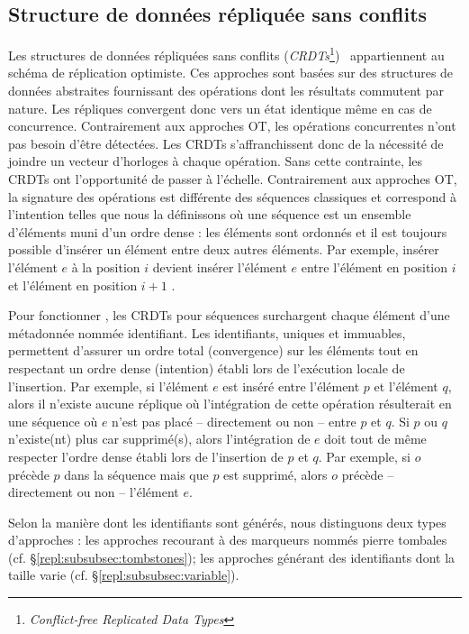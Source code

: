 \subsection{Structure de données répliquée sans conflits}
\label{repl:subsec:crdts}

Les structures de données répliquées sans conflits
(\emph{CRDTs}\footnote{\emph{Conflict-free Replicated Data
    Types}})~\cite{shapiro2011comprehensive, shapiro2011conflict} appartiennent
au schéma de réplication optimiste. Ces approches sont basées sur des structures
de données abstraites fournissant des opérations dont les résultats commutent
par nature. Les répliques convergent donc vers un état identique même en cas de
concurrence. Contrairement aux approches OT, les opérations concurrentes n'ont
pas besoin d'être détectées. Les CRDTs s'affranchissent donc de la nécessité de
joindre un vecteur d'horloges à chaque opération. Sans cette contrainte, les
CRDTs ont l'opportunité de passer à l'échelle. Contrairement aux approches OT,
la signature des opérations est différente des séquences \og classiques \fg et
correspond à l'intention telles que nous la définissons où une séquence est un
ensemble d'éléments muni d'un ordre dense : les éléments sont ordonnés et il est
toujours possible d'insérer un élément entre deux autres éléments. Par exemple,
\og insérer l'élément $e$ à la position $i$ \fg devient \og insérer l'élément
$e$ entre l'élément en position $i$ et l'élément en position $i+1$ \fg.

Pour fonctionner , les CRDTs pour séquences surchargent chaque élément d'une
métadonnée nommée identifiant. Les identifiants, uniques et immuables,
permettent d'assurer un ordre total (convergence) sur les éléments tout en
respectant un ordre dense (intention) établi lors de l'exécution locale de
l'insertion. Par exemple, si l'élément $e$ est inséré entre l'élément $p$ et
l'élément $q$, alors il n'existe aucune réplique où l'intégration de cette
opération résulterait en une séquence où $e$ n'est pas placé -- directement ou
non -- entre $p$ et $q$.  Si $p$ ou $q$ n'existe(nt) plus car supprimé(s), alors
l'intégration de $e$ doit tout de même respecter l'ordre dense établi lors de
l'insertion de $p$ et $q$. Par exemple, si $o$ précède $p$ dans la séquence mais
que $p$ est supprimé, alors $o$ précède -- directement ou non -- l'élément $e$.

Selon la manière dont les identifiants sont générés, nous distinguons deux types
d'approches : les approches recourant à des marqueurs nommés \og pierre tombales
\fg (cf. §\ref{repl:subsubsec:tombstones}); les approches générant des
identifiants dont la taille varie (cf. §\ref{repl:subsubsec:variable}).

